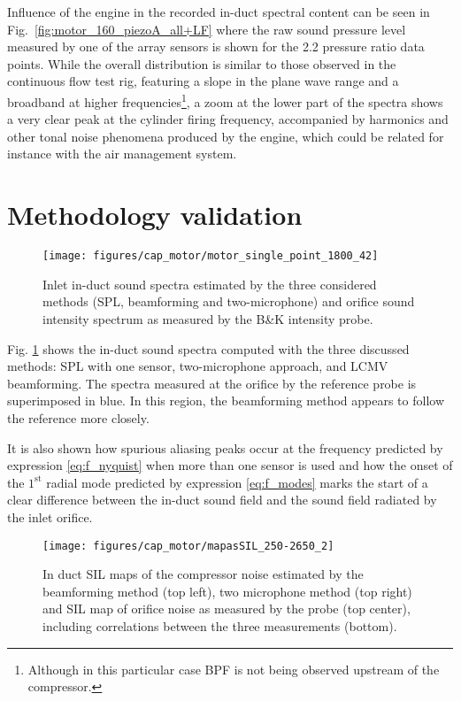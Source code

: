 Influence of the engine in the recorded in-duct spectral content can be seen in Fig.~\ref{fig:motor_160_piezoA_all+LF} where the raw sound pressure level measured by one of the array sensors is shown for the 2.2 pressure ratio data points. While the overall distribution is similar to those observed in the continuous flow test rig, featuring a slope in the plane wave range and a broadband at higher frequencies\footnote{Although in this particular case BPF is not being observed upstream of the compressor.}, a zoom at the lower part of the spectra shows a very clear peak at the cylinder firing frequency, accompanied by harmonics and other tonal noise phenomena produced by the engine, which could be related for instance with the air management system.

\section{Methodology validation}
\label{sub:in_duct_noise_measurements}

\begin{figure}[b!]
\centering
\texttt{[image: figures/cap\_motor/motor\_single\_point\_1800\_42]}
\caption{Inlet in-duct sound spectra estimated by the three considered methods (SPL, beamforming and two-microphone) and orifice sound intensity spectrum as measured by the B\&K intensity probe.}
\label{fig:espectros}
\end{figure}

Fig. \ref{fig:espectros} shows the in-duct sound spectra computed with the three discussed methods: SPL with one sensor, two-microphone approach, and LCMV beamforming. The spectra measured at the orifice by the reference probe is superimposed in blue. In this region, the beamforming method appears to follow the reference more closely.

It is also shown how spurious aliasing peaks occur at the frequency predicted by expression \ref{eq:f_nyquist} when more than one sensor is used and how the onset of the ${1}^\text{st}$ radial mode predicted by expression \ref{eq:f_modes} marks the start of a clear difference between the in-duct sound field and the sound field radiated by the inlet orifice.

\begin{figure*}[b!]
\hspace{-0.06\textwidth}
\texttt{[image: figures/cap\_motor/mapasSIL\_250-2650\_2]}
\caption{In duct SIL maps of the compressor noise estimated by the beamforming method (top left), two microphone method (top right) and SIL map of orifice noise as measured by the probe (top center), including correlations between the three measurements (bottom).}
\label{fig:mapasSIL_250-2650}
\end{figure*}

